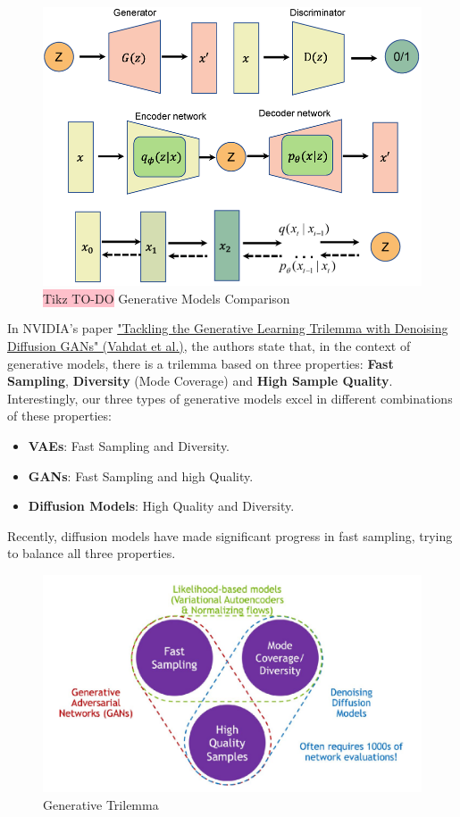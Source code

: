 \begin{figure}[!htbp]
    \centering
    \includegraphics[width=0.7\linewidth]{tikz/chapter10 - Generative Models Comparison.png}
    \caption{{\color{red}\colorbox{pink}{Tikz TO-DO}} Generative Models Comparison}
\end{figure}



In NVIDIA's paper \href{https://arxiv.org/pdf/2112.07804}{"Tackling the Generative Learning Trilemma with Denoising Diffusion GANs" (Vahdat et al.)}, the authors state that, in the context of generative models, there is a trilemma based on three properties: \textbf{Fast Sampling}, \textbf{Diversity} (Mode Coverage) and \textbf{High Sample Quality}. Interestingly, our three types of generative models excel in different combinations of these properties:

\begin{itemize}
    \item \textbf{VAEs}: Fast Sampling and Diversity.
    \item \textbf{GANs}: Fast Sampling and high Quality.
    \item \textbf{Diffusion Models}: High Quality and Diversity.
\end{itemize}

Recently, diffusion models have made significant progress in fast sampling, trying to balance all three properties.

\begin{figure}[H]
    \centering
    \includegraphics[width=0.8\linewidth]{tikz/chapter10 - Generative Trilemma.png}
    \caption{Generative Trilemma}
\end{figure}

